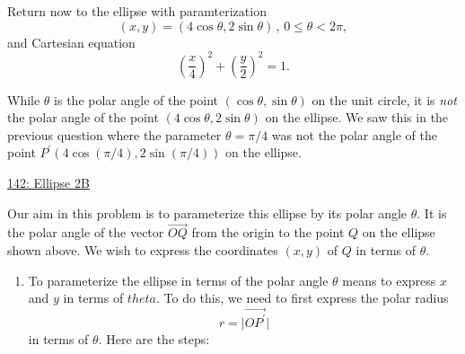 \documentclass{ximera}
\begin{document}
\begin{example} \label{EX:9dfrebbvcxbfg}
Return now to the ellipse with paramterization
\[
      (x,y) = (4\cos \theta , 2\sin\theta) \, , \, 0\leq \theta <2\pi ,
\]
and Cartesian equation
\[
     \left( \frac{x}{4} \right)^2 + \left( \frac{y}{2} \right)^2 = 1.
\]

While $\theta$ is the polar angle of the point $(\cos\theta, \sin\theta)$ on the unit circle, it is \emph{not} the polar angle of the point $(4\cos \theta , 2\sin\theta)$ on the ellipse. We saw this in the previous question where the parameter $\theta=\pi/4$ was not the polar angle of the point $P^\prime(4\cos (\pi/4) , 2\sin (\pi/4))$ on the ellipse.




\begin{onlineOnly}
    \begin{center}
\end{center}
\end{onlineOnly}

\href{https://www.desmos.com/calculator/3skcbdibwx}{142: Ellipse 2B}

Our aim in this problem is to parameterize this ellipse by its polar angle $\theta$.  It is the polar angle of the vector $\overrightarrow{OQ}$ from the origin to the point $Q$ on the ellipse shown above. We wish to express the coordinates $(x,y)$ of $Q$ in terms of $\theta$.


\begin{enumerate}

\item To parameterize the ellipse in terms of the polar angle $\theta$ means to express $x$ and $y$ in terms of $theta$. To do this, we need to first express the polar radius  
\[
   r = \Big| \overrightarrow{OP^\prime}  \Big|
\]
in terms of $\theta$. Here are the steps:



\end{enumerate}
\end{example}
\end{document}
